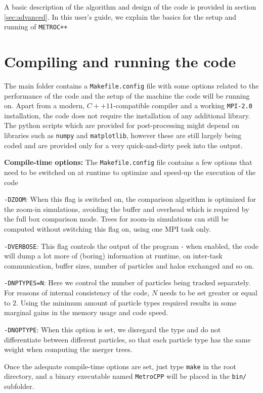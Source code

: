 \documentclass{article}
\begin{document}
A basic description of the algorithm and design of the code is provided in section \ref{sec:advanced}.
In this user's guide, we explain the basics for the setup and running of \texttt{METROC++}


\section{Compiling and running the code}

The main folder contains a \texttt{Makefile.config} file with some options related to the performance of the code and the 
setup of the machine the code will be running on. Apart from a modern, $C++11$-compatible compiler and a working 
\texttt{MPI-2.0} installation, the code does not require the installation of any additional library.
The python scripts which are provided for post-processing might depend on libraries such as \texttt{numpy} and \texttt{matplotlib},
however these are still largely being coded and are provided only for a very quick-and-dirty peek into the output.

\noindent
\textbf{Compile-time options:} The \texttt{Makefile.config} file contains a few options that need to be switched on at runtime 
to optimize and speed-up the execution of the code

\noindent
\texttt{-DZOOM}: When this flag is switched on, the comparison algorithm is optimized for the 
zoom-in simulations, avoiding the buffer and overhead which is required by the full box comparison mode. 
Trees for zoom-in simulations can still be computed without switching this flag on, using one MPI task only.

\noindent
\texttt{-DVERBOSE}: This flag controls the output of the program - when enabled, the code will dump a lot more of 
(boring) information at runtime, on inter-task communication, buffer sizes, number of particles and halos exchanged and so on.

\noindent
\texttt{-DNPTYPES=N}: Here we control the number of particles being tracked separately. For reasons of internal consistency 
of the code, $N$ needs to be set greater or equal to $2$. Using the minimum amount of particle types required results in some marginal
gains in the memory usage and code speed.

\noindent
\texttt{-DNOPTYPE}: When this option is set, we disregard the type and do not differentiate between different particles, so that
each particle type has the same weight when computing the merger trees.

Once the adequate compile-time options are set, just type \texttt{make} in the root directory, and a binary executable named 
\texttt{MetroCPP} will be placed in the \texttt{bin/} subfolder. 
\end{document}
